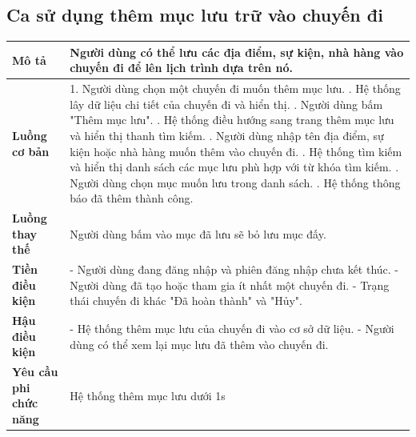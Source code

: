 \subsection{Ca sử dụng thêm mục lưu trữ vào chuyến đi}
\vspace{0.5cm}


\noindent 
\begin{tabularx}{\linewidth}{| l | X |} 
\hline 
\textbf{Mô tả} & Người dùng có thể lưu các địa điểm, sự kiện, nhà hàng vào chuyến đi để lên lịch trình dựa trên nó. \\ 
\hline 
\textbf{Luồng cơ bản} & 1. Người dùng chọn một chuyến đi muốn thêm mục lưu. \newline
                        2. Hệ thống lây dữ liệu chi tiết của chuyến đi và hiển thị. \newline
                        3. Người dùng bấm "Thêm mục lưu". \newline
                        4. Hệ thống điều hướng sang trang thêm mục lưu và hiển thị thanh tìm kiếm. \newline
                        5. Người dùng nhập tên địa điểm, sự kiện hoặc nhà hàng muốn thêm vào chuyến đi. \newline
                        6. Hệ thống tìm kiếm và hiển thị danh sách các mục lưu phù hợp với từ khóa tìm kiếm. \newline
                        7. Người dùng chọn mục muốn lưu trong danh sách. \newline
                        8. Hệ thống thông báo đã thêm thành công. \\
               
\hline 
\textbf{Luồng thay thế} & Người dùng bấm vào mục đã lưu sẽ bỏ lưu mục đấy. \\
       
\hline 
\textbf{Tiền điều kiện} & - Người dùng đang đăng nhập và phiên đăng nhập chưa kết thúc.\newline
- Người dùng đã tạo hoặc tham gia ít nhất một chuyến đi. \newline
- Trạng thái chuyến đi khác "Đã hoàn thành" và "Hủy". \\


\hline 
\textbf{Hậu điều kiện} & - Hệ thống thêm mục lưu của chuyến đi vào cơ sở dữ liệu.\newline
                        - Người dùng có thể xem lại mục lưu đã thêm vào chuyến đi. \\

\hline 
\textbf{Yêu cầu phi chức năng} & Hệ thống thêm mục lưu dưới 1s \\ 
\hline 
\end{tabularx}



